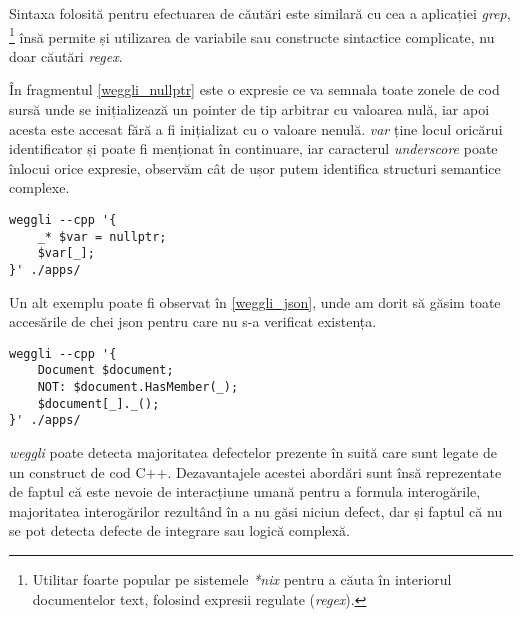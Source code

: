 Sintaxa folosită pentru efectuarea de căutări este similară cu cea a aplicației \textit{grep}, \footnote{Utilitar foarte popular pe sistemele \textit{*nix} pentru a căuta în interiorul documentelor text, folosind expresii regulate (\textit{regex}).} însă permite și utilizarea de variabile sau constructe sintactice complicate, nu doar căutări \textit{regex}.

În fragmentul \ref{weggli_nullptr} este o expresie ce va semnala toate zonele de cod sursă unde se inițializează un pointer de tip arbitrar cu valoarea nulă, iar apoi acesta este accesat fără a fi inițializat cu o valoare nenulă. \textit{var} ține locul oricărui identificator și poate fi menționat în continuare, iar caracterul \textit{underscore} poate înlocui orice expresie, observăm cât de ușor putem identifica structuri semantice complexe.

\begin{lstlisting}[label={weggli_nullptr}, caption={Interogare weggli pentru a găsi accesări de pointer nul}]
weggli --cpp '{
    _* $var = nullptr;
    $var[_];
}' ./apps/
\end{lstlisting}

Un alt exemplu poate fi observat în \ref{weggli_json}, unde am dorit să găsim toate accesările de chei \acrshort{json} pentru care nu s-a verificat existența.

\begin{lstlisting}[label={weggli_json}, caption={Interogare weggli pentru a găsi accesarea de chei JSON fără verificare}]
weggli --cpp '{ 
    Document $document;
    NOT: $document.HasMember(_);
    $document[_]._();
}' ./apps/
\end{lstlisting}

\textit{weggli} poate detecta majoritatea defectelor prezente în suită care sunt legate de un construct de cod C++. Dezavantajele acestei abordări sunt însă reprezentate de faptul că este nevoie de interacțiune umană pentru a formula interogările, majoritatea interogărilor rezultând în a nu găsi niciun defect, dar și faptul că nu se pot detecta defecte de integrare sau logică complexă.



